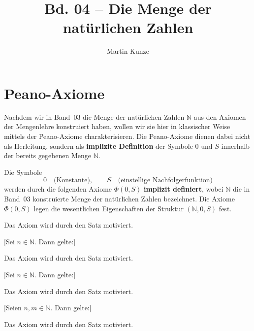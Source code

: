 \documentclass[main.tex]{subfiles}
\title{Bd. 04 – Die Menge der natürlichen Zahlen}
\author{Martin Kunze}
\date{}
\begin{document}
\maketitle
\tableofcontents

\chapter{Peano-Axiome}

Nachdem wir in Band~03 die Menge der natürlichen Zahlen \(\mathbb{N}\) 
aus den Axiomen der Mengenlehre konstruiert haben, wollen wir sie hier 
in klassischer Weise mittels der Peano-Axiome charakterisieren. 
Die Peano-Axiome dienen dabei nicht als Herleitung, sondern als 
\textbf{implizite Definition} der Symbole \(0\) und \(S\) innerhalb der 
bereits gegebenen Menge \(\mathbb{N}\).

\begin{definition}
Die Symbole
\[
0 \quad \text{(Konstante)}, 
\qquad 
S \quad \text{(einstellige Nachfolgerfunktion)}
\]
werden durch die folgenden Axiome \(\Phi(0,S)\) \textbf{implizit definiert}, 
wobei \(\mathbb{N}\) die in Band~03 konstruierte Menge der natürlichen Zahlen 
bezeichnet. 
Die Axiome \(\Phi(0,S)\) legen die wesentlichen Eigenschaften der Struktur 
\((\mathbb{N},0,S)\) fest.
\end{definition}

\begin{remark} 
Das Axiom wird durch den Satz  motiviert.
\end{remark}

[Sei \(n \in \mathbb{N}\). Dann gelte:]
\begin{remark}
Das Axiom wird durch den Satz 
motiviert.
\end{remark}

[Sei \(n \in \mathbb{N}\). Dann gelte:]
\begin{remark}
Das Axiom wird durch den Satz 
motiviert.
\end{remark}

[Seien \(n,m \in \mathbb{N}\). Dann gelte:]
\begin{remark}
Das Axiom wird durch den Satz 
motiviert.
\end{remark}
\end{document}
